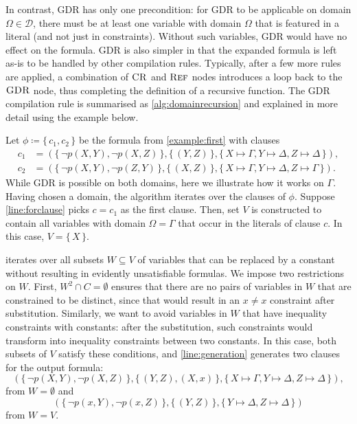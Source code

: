 In contrast, GDR has only one precondition: for GDR to be applicable on domain
$\Omega \in \mathcal{D}$, there must be at least one variable with domain
$\Omega$ that is featured in a literal (and not just in constraints). Without
such variables, GDR would have no effect on the formula. GDR is also simpler in
that the expanded formula is left as-is to be handled by other compilation
rules. Typically, after a few more rules are applied, a combination of $\operatorname{\textsc{CR}}$ and
$\operatorname{\textsc{Ref}}$ nodes introduces a loop back to the $\operatorname{\textsc{GDR}}$ node, thus completing the
definition of a recursive function. The GDR compilation rule is summarised as
\cref{alg:domainrecursion} and explained in more detail using the example below.

\begin{example}
  Let $\phi \coloneqq \{\, c_1, c_2 \,\}$ be the formula from
  \cref{example:first} with clauses
  \begin{align*}
    c_1 &= (\{\, \neg p(X, Y), \neg p(X, Z) \,\}, \{\, (Y, Z) \,\}, \{\, X \mapsto \Gamma, Y \mapsto \Delta, Z \mapsto \Delta \,\}), \\
    c_2 &= (\{\, \neg p(X, Y), \neg p(Z, Y) \,\}, \{\, (X, Z) \,\}, \{\, X \mapsto \Gamma, Y \mapsto \Delta, Z \mapsto \Gamma \,\}).
  \end{align*}
  While GDR is possible on both domains, here we illustrate how it works on
  $\Gamma$. Having chosen a domain, the algorithm iterates over the clauses of
  $\phi$. Suppose \cref{line:forclause} picks $c = c_1$ as the first clause.
  Then, set $V$ is constructed to contain all variables with domain
  $\Omega = \Gamma$ that occur in the literals of clause $c$. In this case,
  $V = \{\, X \,\}$.

   iterates over all subsets $W \subseteq V$ of variables
  that can be replaced by a constant without resulting in evidently
  unsatisfiable formulas. We impose two restrictions on $W$. First,
  $W^2 \cap C = \emptyset$ ensures that there are no pairs of variables in $W$
  that are constrained to be distinct, since that would result in an $x \ne x$
  constraint after substitution. Similarly, we want to avoid variables in $W$
  that have inequality constraints with constants: after the substitution, such
  constraints would transform into inequality constraints between two constants.
  In this case, both subsets of $V$ satisfy these conditions, and
  \cref{line:generation} generates two clauses for the output formula:
  \[
    (\{\, \neg p(X, Y), \neg p(X, Z) \,\}, \{\, (Y, Z), (X, x) \,\}, \{\, X \mapsto \Gamma, Y \mapsto \Delta, Z \mapsto \Delta \,\}),
  \]
  from $W = \emptyset$ and
  \[
    (\{\, \neg p(x, Y), \neg p(x, Z) \,\}, \{\, (Y, Z) \,\}, \{\, Y \mapsto \Delta, Z \mapsto \Delta \,\})
  \]
  from $W = V$.


\end{example}
